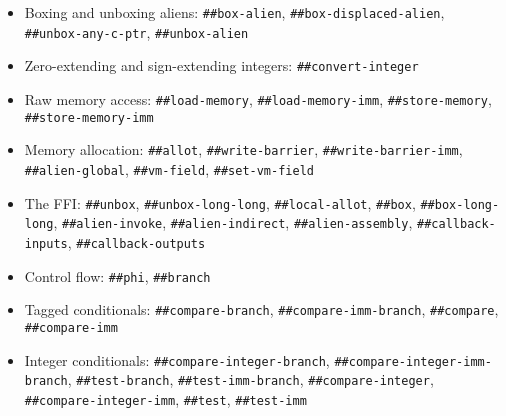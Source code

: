 \begin{itemize}
\item
\begin{flushleft}
Boxing and unboxing aliens:
\Verb|##box-alien|,
\Verb|##box-displaced-alien|,
\Verb|##unbox-any-c-ptr|,
\Verb|##unbox-alien|
\end{flushleft}

\item
\begin{flushleft}
Zero-extending and sign-extending integers:
\Verb|##convert-integer|
\end{flushleft}

\item
\begin{flushleft}
Raw memory access:
\Verb|##load-memory|,
\Verb|##load-memory-imm|,
\Verb|##store-memory|,
\Verb|##store-memory-imm|
\end{flushleft}

\item
\begin{flushleft}
Memory allocation:
\Verb|##allot|,
\Verb|##write-barrier|,
\Verb|##write-barrier-imm|,
\Verb|##alien-global|,
\Verb|##vm-field|,
\Verb|##set-vm-field|
\end{flushleft}

\item
\begin{flushleft}
The \gls{FFI}:
\Verb|##unbox|,
\Verb|##unbox-long-long|,
\Verb|##local-allot|,
\Verb|##box|,
\Verb|##box-long-long|,
\Verb|##alien-invoke|,
\Verb|##alien-indirect|,
\Verb|##alien-assembly|,
\Verb|##callback-inputs|,
\Verb|##callback-outputs|
\end{flushleft}

\item
\begin{flushleft}
Control flow:
\Verb|##phi|,
\Verb|##branch|
\end{flushleft}

\item
\begin{flushleft}
Tagged conditionals:
\Verb|##compare-branch|,
\Verb|##compare-imm-branch|,
\Verb|##compare|,
\Verb|##compare-imm|
\end{flushleft}

\item
\begin{flushleft}
Integer conditionals:
\Verb|##compare-integer-branch|,
\Verb|##compare-integer-imm-branch|,
\Verb|##test-branch|,
\Verb|##test-imm-branch|,
\Verb|##compare-integer|,
\Verb|##compare-integer-imm|,
\Verb|##test|,
\Verb|##test-imm|
\end{flushleft}


\end{itemize}
